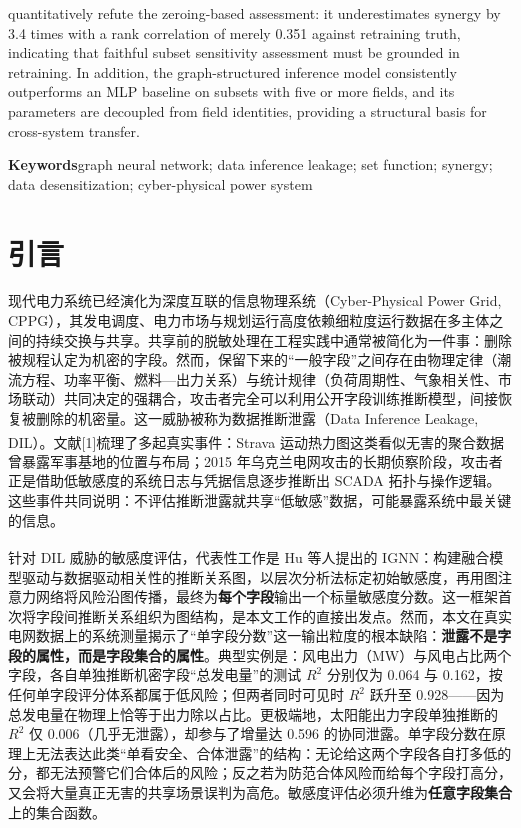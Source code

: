 \documentclass[10.5pt,compsoc,UTF8]{CjC}
\theoremstyle{mystyle}
\newcommand{\upcite}[1]{\textsuperscript{\cite{#1}}}
\begin{document}
{{quantitatively refute the zeroing-based assessment: it underestimates synergy by 3.4 times with a rank correlation of merely 0.351 against retraining truth, indicating that faithful subset sensitivity assessment must be grounded in retraining. In addition, the graph-structured inference model consistently outperforms an MLP baseline on subsets with five or more fields, and its parameters are decoupled from field identities, providing a structural basis for cross-system transfer.
\par}}
\vspace {5mm}

{{\bf Keywords}\quad graph neural network; data inference leakage; set function; synergy; data desensitization; cyber-physical power system\par}

\vskip 10mm

\section{\heiti 引言}

现代电力系统已经演化为深度互联的信息物理系统（Cyber-Physical Power Grid, CPPG），其发电调度、电力市场与规划运行高度依赖细粒度运行数据在多主体之间的持续交换与共享。共享前的脱敏处理在工程实践中通常被简化为一件事：删除被规程认定为机密的字段。然而，保留下来的“一般字段”之间存在由物理定律（潮流方程、功率平衡、燃料—出力关系）与统计规律（负荷周期性、气象相关性、市场联动）共同决定的强耦合，攻击者完全可以利用公开字段训练推断模型，间接恢复被删除的机密量。这一威胁被称为数据推断泄露（Data Inference Leakage, DIL）\upcite{hu2026ignn}。文献[1]梳理了多起真实事件：Strava 运动热力图这类看似无害的聚合数据曾暴露军事基地的位置与布局；2015 年乌克兰电网攻击的长期侦察阶段，攻击者正是借助低敏感度的系统日志与凭据信息逐步推断出 SCADA 拓扑与操作逻辑。这些事件共同说明：不评估推断泄露就共享“低敏感”数据，可能暴露系统中最关键的信息。

针对 DIL 威胁的敏感度评估，代表性工作是 Hu 等人提出的 IGNN\upcite{hu2026ignn}：构建融合模型驱动与数据驱动相关性的推断关系图，以层次分析法标定初始敏感度，再用图注意力网络将风险沿图传播，最终为\textbf{每个字段}输出一个标量敏感度分数。这一框架首次将字段间推断关系组织为图结构，是本文工作的直接出发点。然而，本文在真实电网数据上的系统测量揭示了“单字段分数”这一输出粒度的根本缺陷：\textbf{泄露不是字段的属性，而是字段集合的属性}。典型实例是：风电出力（MW）与风电占比两个字段，各自单独推断机密字段“总发电量”的测试 $R^2$ 分别仅为 0.064 与 0.162，按任何单字段评分体系都属于低风险；但两者同时可见时 $R^2$ 跃升至 0.928——因为总发电量在物理上恰等于出力除以占比。更极端地，太阳能出力字段单独推断的 $R^2$ 仅 0.006（几乎无泄露），却参与了增量达 0.596 的协同泄露。单字段分数在原理上无法表达此类“单看安全、合体泄露”的结构：无论给这两个字段各自打多低的分，都无法预警它们合体后的风险；反之若为防范合体风险而给每个字段打高分，又会将大量真正无害的共享场景误判为高危。敏感度评估必须升维为\textbf{任意字段集合}上的集合函数。
\end{document}
